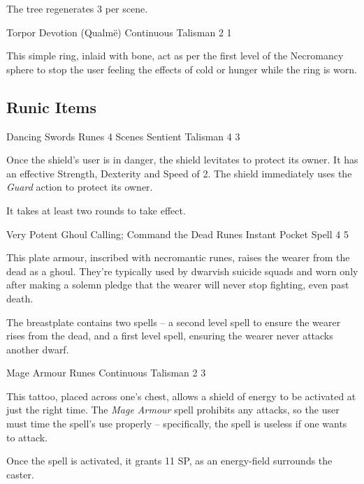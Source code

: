 \begin{multicols}{2}
The tree regenerates 3 per scene.

  {Torpor}%
  {Devotion (Qualm\"{e})}%
  {Continuous}%
  {Talisman}%
  {2}%
  {1}\label{ring_asphyxiation}%

This simple ring, inlaid with bone, act as per the first level of the Necromancy sphere to stop the user feeling the effects of cold or hunger while the ring is worn.

\subsection{Runic Items}

  {Dancing Swords}%
  {Runes}%
  {4 Scenes}%
  {Sentient Talisman}%
  {4}%
  {3}%

Once the shield's user is in danger, the shield levitates to protect its owner.
It has an effective Strength, Dexterity and Speed of 2.
The shield immediately uses the \textit{Guard} action to protect its owner.

It takes at least two rounds to take effect.

  {Very Potent Ghoul Calling; Command the Dead}%
  {Runes}%
  {Instant}%
  {Pocket Spell}%
  {4}%
  {5}%

\label{eternalwarriorarmour}

This plate armour, inscribed with necromantic runes, raises the wearer from the dead as a ghoul.
They're typically used by dwarvish suicide squads and worn only after making a solemn pledge that the wearer will never stop fighting, even past death.

The breastplate contains two spells -- a second level spell to ensure the wearer rises from the dead, and a first level spell, ensuring the wearer never attacks another dwarf.

  {Mage Armour}%
  {Runes}%
  {Continuous}%
  {Talisman}%
  {2}%
  {3}%

This tattoo, placed across one's chest, allows a shield of energy to be activated at just the right time.
The \textit{Mage Armour} spell prohibits any attacks, so the user must time the spell's use properly -- specifically, the spell is useless if one wants to attack.

Once the spell is activated, it grants 11 SP, as an energy-field surrounds the caster.


\end{multicols}
